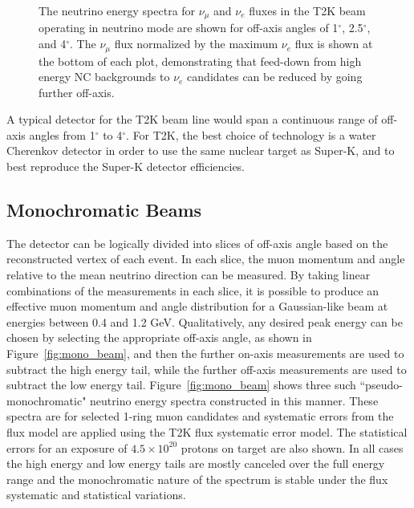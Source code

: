 \begin{figure}[htpb]
\begin{center}
    \end{center}
\caption{The neutrino energy spectra for $\nu_{\mu}$ and $\nu_{e}$ fluxes in the T2K beam operating in neutrino mode are shown for off-axis angles of 1$^{\circ}$, 2.5$^{\circ}$, and 4$^{\circ}$. The $\nu_{\mu}$ flux normalized by the maximum $\nu_e$ flux is shown at the bottom of each plot, demonstrating that feed-down from high energy NC backgrounds to $\nu_{e}$ candidates can be reduced by going further off-axis. }
\label{fig:offaxisfluxes}
\end{figure}

A typical \nuprism detector for the T2K beam line would span a continuous range of off-axis angles from 1$^\circ$ to 4$^\circ$. For T2K, the best choice of technology is a water Cherenkov detector in order to use the same nuclear target as Super-K, and to best reproduce the Super-K detector efficiencies.

\subsection{Monochromatic Beams}

The detector can be logically divided into slices of off-axis angle based on the reconstructed vertex of each
event. In each slice, the muon momentum and angle relative to the mean neutrino direction can be measured. By
taking linear combinations of the measurements in each slice, it is possible to produce an effective muon 
momentum and angle distribution for a Gaussian-like beam at energies between 0.4 and 1.2 GeV. Qualitatively, any
desired peak energy can be chosen by selecting the appropriate off-axis angle, as shown in Figure~\ref{fig:mono_beam}, and then
the further on-axis measurements are used to subtract the high energy tail, while the further off-axis 
measurements are used to subtract the low energy tail. Figure~\ref{fig:mono_beam} shows three such 
``pseudo-monochromatic" neutrino energy spectra constructed in this manner. These spectra are for selected 
1-ring muon candidates and systematic errors from the flux model are applied using the T2K flux systematic 
error model.  The statistical errors for an exposure of $4.5\times10^{20}$ protons on target are also shown. 
In all cases the high energy and low energy tails are mostly canceled over the full energy range and the 
monochromatic nature of the spectrum is stable under the flux systematic and statistical variations.

